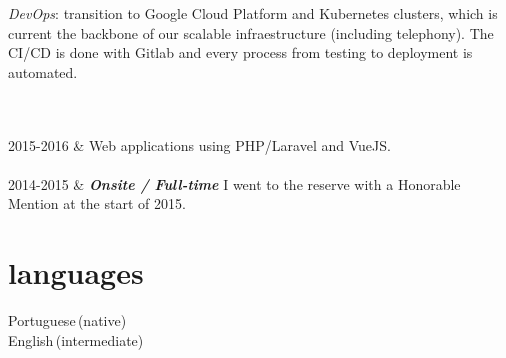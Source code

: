 \documentclass[]{cv-mauri}
\begin{document}
\begin{tabularcv}
		    \textit{DevOps}: transition to Google Cloud Platform and Kubernetes clusters, which is current the backbone of our scalable infraestructure (including telephony). The CI/CD is done with Gitlab and every process from testing to deployment is automated.

		    \\[\vspacepar]
		    \\[\vspacepar]
    2015-2016   &   
                    \newline
                    Web applications using PHP/Laravel and VueJS.
                    \\[\vspacepar]
                    \\[\vspacepar]
	2014-2015   &   
					\textbf{\textit{Onsite / Full-time}}
					\newline
					I went to the reserve with a Honorable Mention at the start of 2015.
\end{tabularcv}

\section*{languages}
\begin{tabularcv}
    Portuguese\,(native) \\
    English\,(intermediate)
\end{tabularcv}

\end{document}
